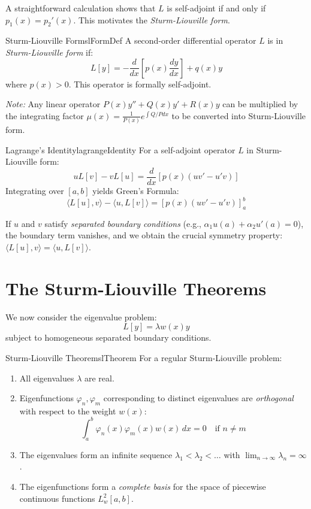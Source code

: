 \documentclass{book}
\renewcommand{\phi}{\varphi}
\begin{document}
A straightforward calculation shows that $L$ is self-adjoint if and only if $p_1(x) = p_2'(x)$. This motivates the \emph{Sturm-Liouville form}.

\begin{defn}{Sturm-Liouville Form}{slFormDef}
    A second-order differential operator $L$ is in \emph{Sturm-Liouville form} if:
    \[
        L[y] = -\frac{d}{dx}\left[ p(x)\frac{dy}{dx} \right] + q(x)y
    \]
    where $p(x) > 0$. This operator is formally self-adjoint.
\end{defn}

\emph{Note:} Any linear operator $P(x)y'' + Q(x)y' + R(x)y$ can be multiplied by the integrating factor $\mu(x) = \frac{1}{P(x)}e^{\int Q/P dx}$ to be converted into Sturm-Liouville form.

\begin{thm}{Lagrange's Identity}{lagrangeIdentity}
    For a self-adjoint operator $L$ in Sturm-Liouville form:
    \[
        u L[v] - v L[u] = \frac{d}{dx} \left[ p(x)(u v' - u' v) \right]
    \]
    Integrating over $[a,b]$ yields Green's Formula:
    \[
        \langle L[u], v \rangle - \langle u, L[v] \rangle = \left[ p(x)(u v' - u' v) \right]_a^b
    \]
\end{thm}

If $u$ and $v$ satisfy \emph{separated boundary conditions} (e.g., $\alpha_1 u(a) + \alpha_2 u'(a) = 0$), the boundary term vanishes, and we obtain the crucial symmetry property: $\langle L[u], v \rangle = \langle u, L[v] \rangle$.

\section{The Sturm-Liouville Theorems}

We now consider the eigenvalue problem:
\[
    L[y] = \lambda w(x) y
\]
subject to homogeneous separated boundary conditions.

\begin{thm}{Sturm-Liouville Theorem}{slTheorem}
    For a regular Sturm-Liouville problem:
    \begin{enumerate}
        \item All eigenvalues $\lambda$ are real.
        \item Eigenfunctions $\phi_n, \phi_m$ corresponding to distinct eigenvalues are \emph{orthogonal} with respect to the weight $w(x)$:
        \[
            \int_a^b \phi_n(x) \phi_m(x) w(x) \, dx = 0 \quad \text{if } n \ne m
        \]
        \item The eigenvalues form an infinite sequence $\lambda_1 < \lambda_2 < \dots$ with $\lim_{n\to\infty} \lambda_n = \infty$.
        \item The eigenfunctions form a \emph{complete basis} for the space of piecewise continuous functions $L^2_w[a,b]$.
    \end{enumerate}
\end{thm}
\end{document}
